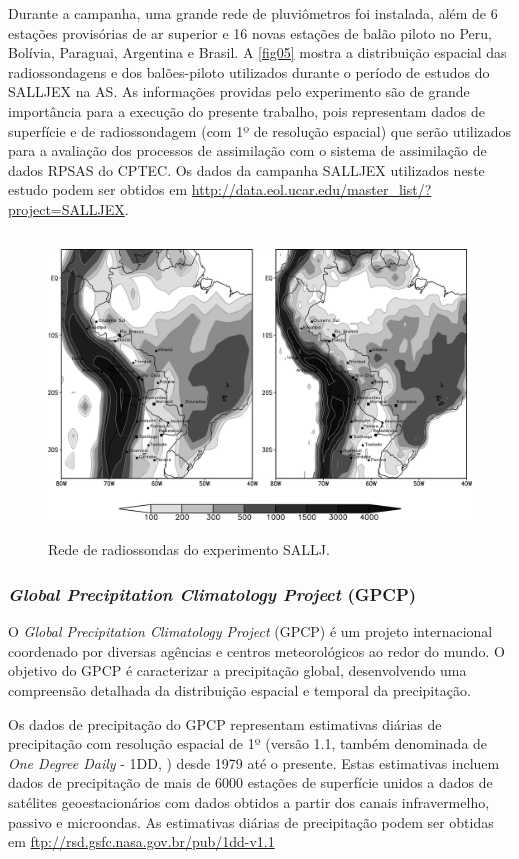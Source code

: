 Durante a campanha, uma grande rede de pluviômetros foi instalada, além de 6 estações provisórias de ar superior e 16 novas estações de balão piloto no Peru, Bolívia, Paraguai, Argentina e Brasil. A \autoref{fig05} mostra a distribuição espacial das radiossondagens e dos balões-piloto utilizados durante o período de estudos do SALLJEX na AS. As informações providas pelo experimento são de grande importância para a execução do presente trabalho, pois representam dados de superfície e de radiossondagem (com 1º de resolução espacial) que serão utilizados para a avaliação dos processos de assimilação com o sistema de assimilação de dados RPSAS do CPTEC. Os dados da campanha SALLJEX utilizados neste estudo podem ser obtidos em \url{http://data.eol.ucar.edu/master_list/?project=SALLJEX}.

\begin{figure}[!hbp]
\centering
\includegraphics[height=8cm]{./figs/rede-salljex.png}
\caption{Rede de radiossondas do experimento SALLJ.}
\label{fig05}
\end{figure}

\subsubsection{\textit{Global Precipitation Climatology Project} (GPCP)}

O \textit{Global Precipitation Climatology Project} (GPCP) \cite{wcrp86} é um projeto internacional coordenado por diversas agências e centros meteorológicos ao redor do mundo. O objetivo do GPCP é caracterizar a precipitação global, desenvolvendo uma compreensão detalhada da distribuição espacial e temporal da precipitação.

Os dados de precipitação do GPCP representam estimativas diárias de precipitação com resolução espacial de 1º (versão 1.1, também denominada de \textit{One Degree Daily} - 1DD, \cite{huffmanetal97}) desde 1979 até o presente. Estas estimativas incluem dados de precipitação de mais de 6000 estações de superfície unidos a dados de satélites geoestacionários com dados obtidos a partir dos canais  infravermelho, passivo e microondas. As estimativas diárias de precipitação podem ser obtidas em \url{ftp://rsd.gsfc.nasa.gov.br/pub/1dd-v1.1}

